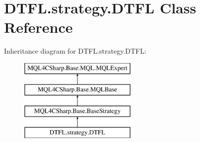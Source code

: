 \hypertarget{class_d_t_f_l_1_1strategy_1_1_d_t_f_l}{}\section{D\+T\+F\+L.\+strategy.\+D\+T\+FL Class Reference}
\label{class_d_t_f_l_1_1strategy_1_1_d_t_f_l}
Inheritance diagram for D\+T\+F\+L.\+strategy.\+D\+T\+FL\+:\begin{figure}[H]
\begin{center}
\leavevmode
\includegraphics[height=4.000000cm]{class_d_t_f_l_1_1strategy_1_1_d_t_f_l}
\end{center}
\end{figure}
